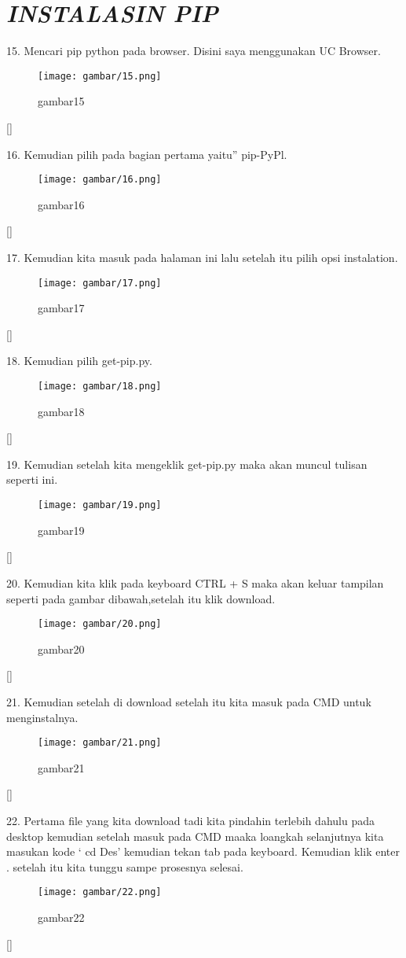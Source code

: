 \section*{\textit{INSTALASIN PIP}}
\item 15.  Mencari pip python pada browser. Disini saya menggunakan UC Browser.
\begin{figure}[h]
    \centering
    \texttt{[image: gambar/15.png]}
    \caption{gambar15}
    \label{fig:my_label}
\end{figure}[]
\item 16.  Kemudian pilih pada bagian pertama yaitu” pip-PyPl.
\begin{figure}[h]
    \centering
    \texttt{[image: gambar/16.png]}
    \caption{gambar16}
    \label{fig:my_label}
\end{figure}[]
\item 17.  Kemudian kita masuk pada halaman ini lalu setelah itu pilih opsi instalation.
\begin{figure}[h]
    \centering
    \texttt{[image: gambar/17.png]}
    \caption{gambar17}
    \label{fig:my_label}
\end{figure}[]
\item 18.  Kemudian pilih get-pip.py.
\begin{figure}[h]
    \centering
    \texttt{[image: gambar/18.png]}
    \caption{gambar18}
    \label{fig:my_label}
\end{figure}[]
\item 19. Kemudian setelah kita mengeklik get-pip.py maka akan muncul tulisan seperti ini.
\begin{figure}[h]
    \centering
    \texttt{[image: gambar/19.png]}
    \caption{gambar19}
    \label{fig:my_label}
\end{figure}[]
\item 20.  Kemudian kita klik pada keyboard CTRL + S maka akan keluar tampilan seperti pada gambar dibawah,setelah itu klik download.
\begin{figure}[h]
    \centering
    \texttt{[image: gambar/20.png]}
    \caption{gambar20}
    \label{fig:my_label}
\end{figure}[]
\item 21.  Kemudian setelah di download setelah itu kita masuk pada CMD untuk menginstalnya.
\begin{figure}[h]
    \centering
    \texttt{[image: gambar/21.png]}
    \caption{gambar21}
    \label{fig:my_label}
\end{figure}[]
\item 22. Pertama file yang kita download tadi kita pindahin terlebih dahulu pada desktop kemudian setelah masuk pada CMD  maaka loangkah selanjutnya kita masukan kode ‘ cd Des’ kemudian tekan tab pada keyboard. Kemudian klik enter . setelah itu kita  tunggu  sampe prosesnya selesai.
\begin{figure}[h]
    \centering
    \texttt{[image: gambar/22.png]}
    \caption{gambar22}
    \label{fig:my_label}
\end{figure}[]

